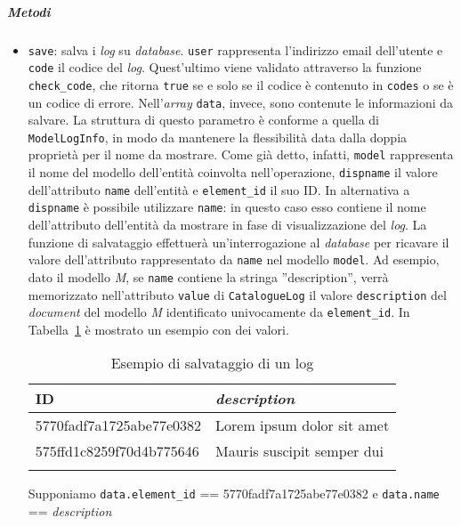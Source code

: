 \subparagraph{Metodi} 
\begin{itemize}
\item \texttt{save}: salva i \textit{log} su \textit{database}. \texttt{user} rappresenta l'indirizzo email dell'utente e \texttt{code} il codice del \textit{log}. Quest'ultimo viene validato attraverso la funzione \texttt{check\_code}, che ritorna \texttt{true} se e solo se il codice è contenuto in \texttt{codes} o se è un codice di errore. Nell'\textit{array} \texttt{data}, invece, sono contenute le informazioni da salvare. La struttura di questo parametro è conforme a quella di \texttt{ModelLogInfo}, in modo da mantenere la flessibilità data dalla doppia proprietà per il nome da mostrare. Come già detto, infatti, \texttt{model} rappresenta il nome del modello dell'entità coinvolta nell'operazione, \texttt{dispname} il valore dell'attributo \texttt{name} dell'entità e \texttt{element\_id} il suo ID. In alternativa a \texttt{dispname} è possibile utilizzare \texttt{name}: in questo caso esso contiene il nome dell'attributo dell'entità da mostrare in fase di visualizzazione del \textit{log}. La funzione di salvataggio effettuerà un'interrogazione al \textit{database} per ricavare il valore dell'attributo rappresentato da \texttt{name} nel modello \texttt{model}. Ad esempio, dato il modello \textit{M}, se \texttt{name} contiene la stringa ''description'', verrà memorizzato nell'attributo \texttt{value} di \texttt{CatalogueLog} il valore \texttt{description} del \textit{document} del modello \textit{M} identificato univocamente da \texttt{element\_id}. In Tabella~\ref{tab:esempioLog} è mostrato un esempio con dei valori. 
\begin{center}
  \bgroup
  
  \begin{longtable}{ | m{4cm} | m{5cm} |}
    \hline
    \cellcolor[gray]{0.9}\textbf{ID} & \cellcolor[gray]{0.9}\textbf{\textit{description}} \\ \hline
    5770fadf7a1725abe77e0382 & Lorem ipsum dolor sit amet \\ \hline
    575ffd1c8259f70d4b775646 & Mauris suscipit semper dui \\ \hline
    \caption[Esempio di salvataggio di un log]{Esempio di salvataggio di un log}
    \label{tab:esempioLog} 
    \end{longtable}
  \egroup
\end{center} 
Supponiamo 
\newline \texttt{data.element\_id} == 5770fadf7a1725abe77e0382 e 
\newline \texttt{data.name} == \textit{description}


\end{itemize}
